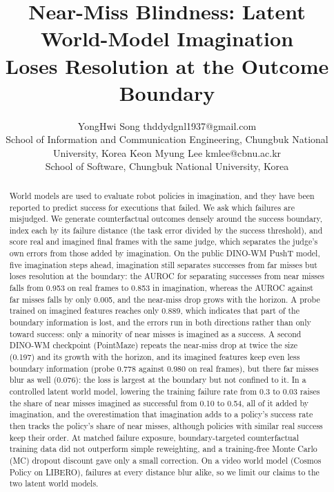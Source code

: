 \documentclass[10pt]{article}
\title{Near-Miss Blindness: Latent World-Model Imagination\\Loses Resolution at the Outcome Boundary}
\author{\name YongHwi Song \email thddydgnl1937@gmail.com \\
      \addr School of Information and Communication Engineering, Chungbuk National University, Korea
      \AND
      \name Keon Myung Lee \email kmlee@cbnu.ac.kr \\
      \addr School of Software, Chungbuk National University, Korea}
\begin{document}
\maketitle

\begin{abstract}
World models are used to evaluate robot policies in imagination, and they have been reported to predict success for executions that failed. We ask which failures are misjudged. We generate counterfactual outcomes densely around the success boundary, index each by its failure distance (the task error divided by the success threshold), and score real and imagined final frames with the same judge, which separates the judge's own errors from those added by imagination. On the public DINO-WM PushT model, five imagination steps ahead, imagination still separates successes from far misses but loses resolution at the boundary: the AUROC for separating successes from near misses falls from 0.953 on real frames to 0.853 in imagination, whereas the AUROC against far misses falls by only 0.005, and the near-miss drop grows with the horizon. A probe trained on imagined features reaches only 0.889, which indicates that part of the boundary information is lost, and the errors run in both directions rather than only toward success: only a minority of near misses is imagined as a success. A second DINO-WM checkpoint (PointMaze) repeats the near-miss drop at twice the size (0.197) and its growth with the horizon, and its imagined features keep even less boundary information (probe 0.778 against 0.980 on real frames), but there far misses blur as well (0.076): the loss is largest at the boundary but not confined to it. In a controlled latent world model, lowering the training failure rate from 0.3 to 0.03 raises the share of near misses imagined as successful from 0.10 to 0.54, all of it added by imagination, and the overestimation that imagination adds to a policy's success rate then tracks the policy's share of near misses, although policies with similar real success keep their order. At matched failure exposure, boundary-targeted counterfactual training data did not outperform simple reweighting, and a training-free Monte Carlo (MC) dropout discount gave only a small correction. On a video world model (Cosmos Policy on LIBERO), failures at every distance blur alike, so we limit our claims to the two latent world models.
\end{abstract}

\end{document}
